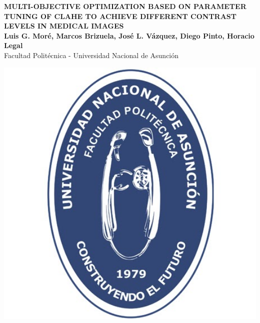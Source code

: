 \documentclass[a0,landscape,spanish]{a0poster}
\begin{document}


\begin{minipage}[b]{0.75\linewidth}
\veryHuge \color{NavyBlue} \textbf{MULTI-OBJECTIVE OPTIMIZATION BASED ON PARAMETER TUNING OF CLAHE TO ACHIEVE DIFFERENT CONTRAST LEVELS IN MEDICAL IMAGES} \color{Black}\\[2ex] %
\huge \textbf{Luis G. Moré, Marcos Brizuela, José L. Vázquez, Diego Pinto, Horacio Legal}\\[0.5cm] %
\huge Facultad Politécnica - Universidad Nacional de Asunción%
\end{minipage}
%
\begin{minipage}[b]{0.25\linewidth}
\includegraphics[width=19cm]{photo.jpg}\\
\end{minipage}
\end{document}
